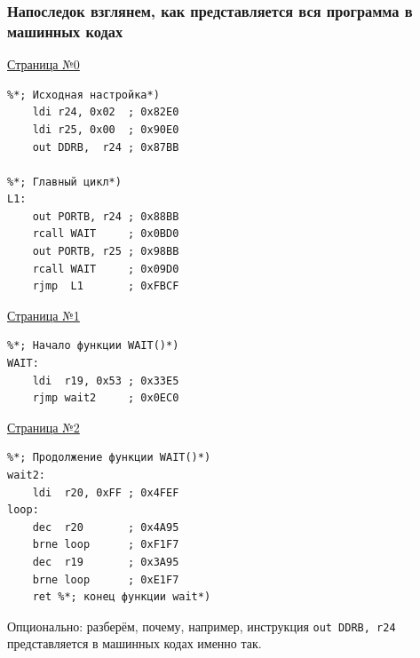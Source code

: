 \documentclass[aspectratio=169, pdf, 8pt, unicode]{beamer}
\begin{document}
\begin{frame}[fragile]
\frametitle{Напоследок взглянем, как представляется вся программа в машинных кодах}
		\noindent\makebox[\linewidth]{\rule{\paperwidth}{0.4pt}}
		\begin{minipage}[t]{.32\textwidth}
			\centering
			{ \large \underline{Страница №0} }
			\begin{lstlisting}
%*; Исходная настройка*)
    ldi r24, 0x02  ; 0x82E0
    ldi r25, 0x00  ; 0x90E0
    out DDRB,  r24 ; 0x87BB

%*; Главный цикл*)
L1:
    out PORTB, r24 ; 0x88BB
    rcall WAIT     ; 0x0BD0
    out PORTB, r25 ; 0x98BB
    rcall WAIT     ; 0x09D0
    rjmp  L1       ; 0xFBCF
			\end{lstlisting}
		\end{minipage}
		\begin{minipage}[t]{.32\textwidth}
			\centering
			{ \large \underline{Страница №1} }
			\begin{lstlisting}
%*; Начало функции WAIT()*)
WAIT:
    ldi  r19, 0x53 ; 0x33E5
    rjmp wait2     ; 0x0EC0
			\end{lstlisting}
		\end{minipage}
		\begin{minipage}[t]{.32\textwidth}
			\centering
			{ \large \underline{Страница №2} }
			\begin{lstlisting}
%*; Продолжение функции WAIT()*)
wait2:
    ldi  r20, 0xFF ; 0x4FEF
loop:
    dec  r20       ; 0x4A95
    brne loop      ; 0xF1F7
    dec  r19       ; 0x3A95
    brne loop      ; 0xE1F7
    ret %*; конец функции wait*)
			\end{lstlisting}
		\end{minipage}
			Опционально: разберём, почему, например, инструкция \texttt{out DDRB, r24} представляется в
			машинных кодах именно так.
\end{frame}
\end{document}
